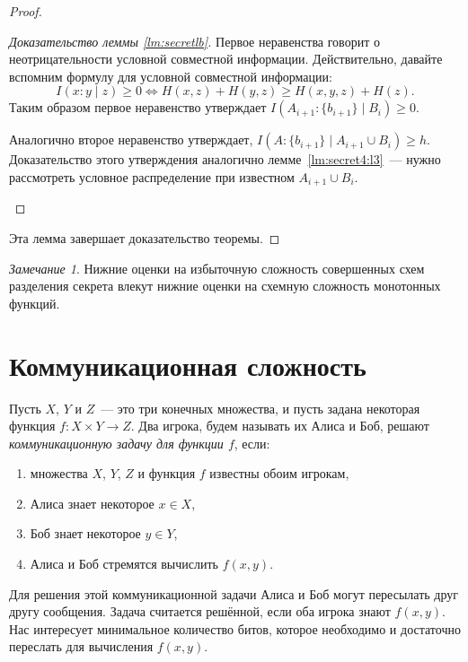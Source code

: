 \documentclass[12pt]{article}
\theoremstyle{definition}
\theoremstyle{plain}
\theoremstyle{remark}
\newtheorem{remark}{Замечание}[section]
\begin{document}
\begin{proof}
\begin{proof}[Доказательство леммы \ref{lm:secretlb}]
        Первое неравенства говорит о неотрицательности условной совместной информации.
        Действительно, давайте вспомним формулу для условной совместной информации:
        \[
            I(x:y\mid z) \ge 0 \iff H(x,z) + H(y,z)\ge H(x,y,z) + H(z).
        \]
        Таким образом первое неравенство утверждает $I(A_{i+1}:\{b_{i+1}\}\mid B_i)\ge 0$.

        Аналогично второе неравенство утверждает, $I(A:\{b_{i+1}\}\mid A_{i+1}\cup B_i)\ge h$.
        Доказательство этого утверждения аналогично лемме~\ref{lm:secret4:l3}~--- нужно рассмотреть
        условное распределение при известном $A_{i+1}\cup B_i$.
    \begin{center}
    \end{center}
    \end{proof}
    Эта лемма завершает доказательство теоремы.
\end{proof}
    \begin{remark}
        Нижние оценки на избыточную сложность совершенных схем разделения
        секрета влекут нижние оценки на схемную сложность монотонных функций.
    \end{remark}

\section{Коммуникационная сложность}
Пусть $X$, $Y$ и $Z$~--- это три конечных множества, и пусть задана некоторая функция $f:X\times Y \to Z$.
Два игрока, будем называть их Алиса и Боб, решают \emph{коммуникационную задачу для функции $f$}, если:
\begin{enumerate}
    \item множества $X$, $Y$, $Z$ и функция $f$ известны обоим игрокам,
    \item Алиса знает некоторое $x\in X$,
    \item Боб знает некоторое $y\in Y$,
    \item Алиса и Боб стремятся вычислить $f(x,y)$.
\end{enumerate}
Для решения этой коммуникационной задачи Алиса и Боб могут пересылать друг другу сообщения.
Задача считается решённой, если оба игрока знают $f(x,y)$.
Нас интересует минимальное количество битов, которое необходимо и достаточно переслать
для вычисления $f(x,y)$.
\end{document}
